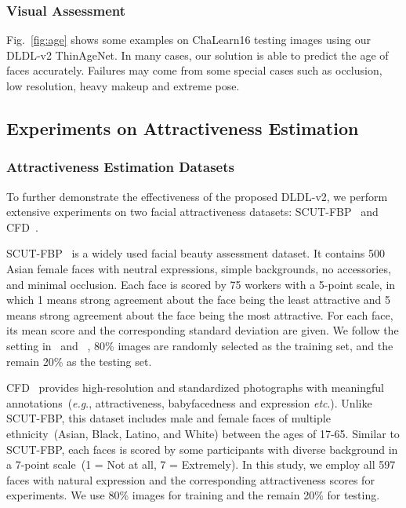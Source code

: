 \documentclass[5p,times,twocolumn]{elsarticle}
\makeatletter
\DeclareRobustCommand\onedot{\@onedot}
\def\@onedot{.}
\def\eg{\emph{e.g}\onedot}
\def\etc{\emph{etc}\onedot}
\makeatother
\begin{document}
\subsubsection{Visual Assessment}
Fig.~\ref{fig:age} shows some examples on ChaLearn16 testing images using our DLDL-v2 ThinAgeNet. In many cases, our solution is able to predict the age of faces accurately. Failures may come from some special cases such as occlusion, low resolution, heavy makeup and extreme pose.

\subsection{Experiments on Attractiveness Estimation}
\subsubsection{Attractiveness Estimation Datasets}
To further demonstrate the effectiveness of the proposed DLDL-v2, we perform extensive experiments on two facial attractiveness datasets: SCUT-FBP~\cite{xie2015scut} and CFD~\cite{ma2015chicago}.

SCUT-FBP~\cite{xie2015scut} is a widely used facial beauty assessment dataset. It contains 500 Asian female faces with neutral expressions, simple backgrounds, no accessories, and minimal occlusion. Each face is scored by 75 workers with a 5-point scale, in which 1 means strong agreement about the face being the least attractive and 5 means strong agreement about the face being the most attractive. For each face, its mean score and the corresponding standard deviation are given. We follow the setting in~\cite{fan2017label} and ~\cite{xie2015scut}, 80\% images are randomly selected as the training set, and the remain 20\% as the testing set.

CFD~\cite{ma2015chicago} provides high-resolution and standardized photographs with meaningful annotations~(\eg, attractiveness, babyfacedness and expression \etc). Unlike SCUT-FBP, this dataset includes male and female faces of multiple ethnicity~(Asian, Black, Latino, and White) between the ages of 17-65. Similar to SCUT-FBP, each faces is scored by some participants with diverse background in a 7-point scale~(1 = Not at all, 7 = Extremely). In this study, we employ all 597 faces with natural expression and the corresponding attractiveness scores for experiments. We use 80\% images for training and the remain 20\% for testing.
\end{document}
